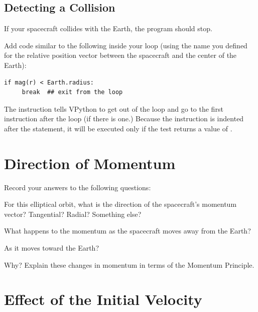 \documentclass[11pt]{article}
\begin{document}
\subsection{Detecting a Collision}

If your spacecraft collides with the Earth, the program should stop.\\

\begin{compactitem}[\color{MIRed}$\Rightarrow$]
\item Add code similar to the following inside your loop (using the name you defined for the relative position vector between the spacecraft and the center of the Earth):   
\end{compactitem}


\color{CodeColor}
\begin{Verbatim}
if mag(r) < Earth.radius:
     break  ## exit from the loop
\end{Verbatim}
\color{black}

The  instruction tells VPython to get out of the loop and go to the first instruction after the loop (if there is one.)  Because the  instruction is indented after the  statement, it will be executed only if the  test returns a value of .


\section{Direction of Momentum}

Record your answers to the following questions:\\

\begin{compactitem}[\color{MIRed}$\Rightarrow$]
\item For this elliptical orbit, what is the direction of the spacecraft's momentum vector? Tangential? Radial? Something else?
\item What happens to the momentum as the spacecraft moves away from the Earth?   
\item As it moves toward the Earth?
\item Why? Explain these changes in momentum in terms of the Momentum Principle.
\end{compactitem}


\section{Effect of the Initial Velocity}
\end{document}
